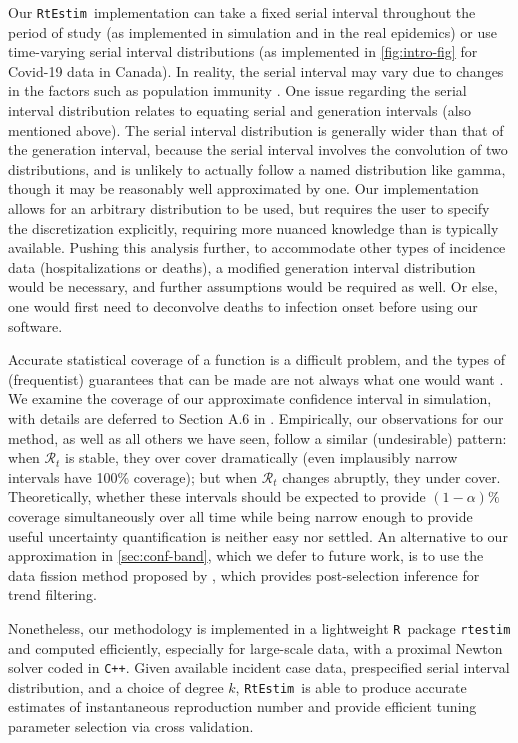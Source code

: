 \documentclass[10pt,letterpaper]{article}
\newcommand{\R}{\texttt{R}}
\newcommand{\cpp}{\texttt{C++}}
\def\RtEstim{\texttt{RtEstim}}
\begin{document}
Our \RtEstim\ implementation can take a fixed serial interval throughout the
period of study (as implemented in simulation and in the real epidemics) or 
use time-varying serial interval distributions (as implemented 
in \autoref{fig:intro-fig} for Covid-19 data in Canada). In reality, the serial
interval may vary due to changes in the factors such as population immunity 
\cite{nash2023estimating}. One issue regarding the serial interval distribution 
relates to equating serial and generation intervals (also mentioned above). 
The serial interval distribution is generally wider than that 
of the generation interval, because the serial interval involves the convolution
of two distributions, and is unlikely to actually follow a named distribution
like gamma, though it may be reasonably well approximated by one. Our
implementation allows for an arbitrary distribution to be used, but requires the
user to specify the discretization explicitly, requiring more nuanced knowledge
than is typically available. Pushing this analysis further, to accommodate other
types of incidence data (hospitalizations or deaths), a modified generation
interval distribution would be necessary, and further assumptions would be
required as well. Or else, one would first need to deconvolve deaths to
infection onset before using our software.


Accurate statistical coverage of a function is a difficult problem, and the
types of (frequentist) guarantees that can be made are not always what one would
want \cite{genovese2008adaptive}. We examine the coverage of our approximate
confidence interval in simulation, with details are deferred to Section A.6 in
. Empirically, our observations for our method, as well as all
others we have seen, follow a similar (undesirable) pattern: when
$\mathcal{R}_t$ is stable, they over cover dramatically (even implausibly narrow
intervals have 100\% coverage); but when $\mathcal{R}_t$ changes abruptly, they
under cover. Theoretically, whether these intervals should be expected to
provide $(1-\alpha)\%$ coverage simultaneously over all time while being narrow
enough to provide useful uncertainty quantification is neither easy nor settled.
An alternative to our approximation in \autoref{sec:conf-band}, which we defer
to future work, is to use the data fission method proposed by
\cite{leiner2023data}, which provides post-selection inference for trend
filtering.


Nonetheless, our methodology is implemented in a lightweight \R\ package
\texttt{rtestim} and computed efficiently, especially for large-scale data, with
a proximal Newton solver coded in \cpp. Given available incident case data,
prespecified serial interval distribution, and a choice of degree $k$, \RtEstim\
is able to produce accurate estimates of instantaneous reproduction number and
provide efficient tuning parameter selection via cross validation. 
\end{document}
